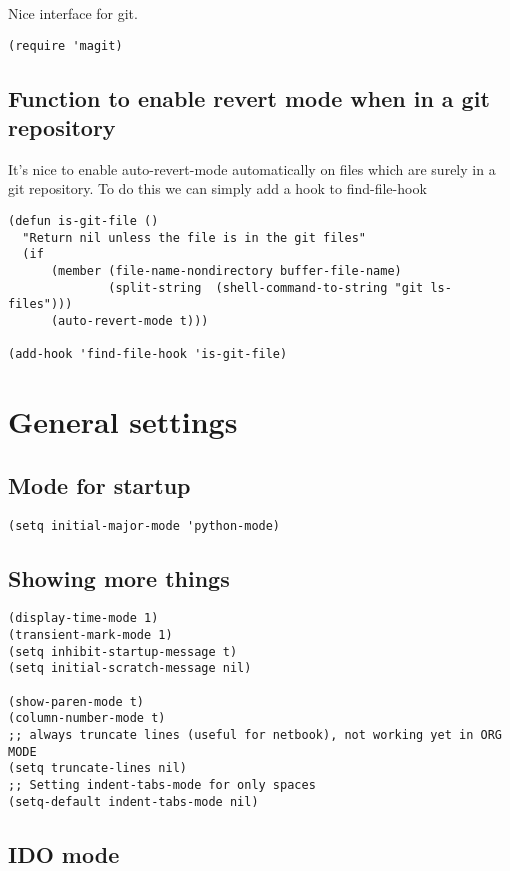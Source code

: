 \documentclass[11pt]{article}
\begin{document}
   Nice interface for git.
\begin{verbatim}
(require 'magit)
\end{verbatim}
\subsection{Function to enable revert mode when in a git repository}
\label{sec-36.2}

   It's nice to enable auto-revert-mode automatically on files which are surely in a git repository.
   To do this we can simply add a hook to find-file-hook
\begin{verbatim}
(defun is-git-file ()
  "Return nil unless the file is in the git files"
  (if
      (member (file-name-nondirectory buffer-file-name)
              (split-string  (shell-command-to-string "git ls-files")))
      (auto-revert-mode t)))

(add-hook 'find-file-hook 'is-git-file)
\end{verbatim}
\section{General settings}
\label{sec-37}
\subsection{Mode for startup}
\label{sec-37.1}

\begin{verbatim}
(setq initial-major-mode 'python-mode)
\end{verbatim}
\subsection{Showing more things}
\label{sec-37.2}

\begin{verbatim}
(display-time-mode 1)
(transient-mark-mode 1)
(setq inhibit-startup-message t)
(setq initial-scratch-message nil)

(show-paren-mode t)
(column-number-mode t)
;; always truncate lines (useful for netbook), not working yet in ORG MODE
(setq truncate-lines nil)
;; Setting indent-tabs-mode for only spaces
(setq-default indent-tabs-mode nil)
\end{verbatim}
\subsection{IDO mode}
\label{sec-37.3}
\end{document}
